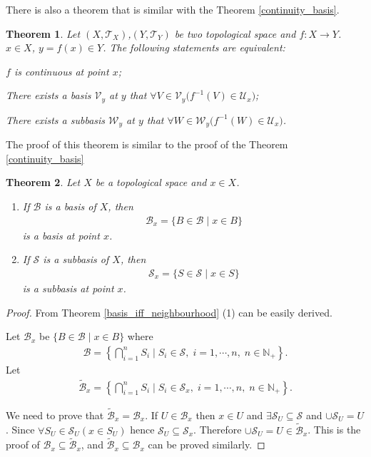 \documentclass[openany]{book}
\theoremstyle{plain}
\newtheorem{theorem}{Theorem}[section] %
\theoremstyle{definition}
\begin{document}
There is also a theorem that is similar with the Theorem \ref{continuity_basis}.

\begin{theorem}\label{continuity_basis_neighbourhood}
Let $(X,\mathscr T_X)$,$(Y,\mathscr T_Y)$ be two topological space and $f \colon X\to Y$.
$x\in X$, $y = f(x)\in Y$.
The following statements are equivalent:
\begin{conditionlist}[label=(\arabic*)]
\item $f $ is continuous at point $x$;
\item There exists a basis $\mathscr V_y$ at $y$ that $\forall V\in \mathscr V_y\big(
	f^{-1}(V) \in \mathscr U_x\big)$;
\item There exists a subbasis $\mathscr W_y$ at $y$ that $\forall W\in \mathscr W_y\big(
	f^{-1}(W) \in \mathscr U_x\big)$.
\end{conditionlist}
\end{theorem}
The proof of this theorem is similar to the proof of the Theorem \ref{continuity_basis}

\begin{theorem}\label{basis_subbasis_topology_and_neighbourhood}
Let $X$ be a topological space and $x \in X$.
\begin{enumerate}[label=(\arabic*)]
\item If $\mathscr B$ is a basis of $X$, then
\begin{align*}
	\mathscr B_x = \{B\in \mathscr B\mid x \in B\}
\end{align*}
is a basis at point $x$.
\item If $\mathscr S$ is a subbasis of $X$, then
\begin{align*}
	\mathscr S_x = \{S\in \mathscr S\mid x \in S\}
\end{align*}
is a subbasis at point $x$.
\end{enumerate}
\end{theorem}
\begin{proof}
From Theorem \ref{basis_iff_neighbourhood} (1) can be easily derived. 

Let $\mathscr B_x$ be $\{B\in \mathscr B\mid x\in B\}$ where
\begin{align*}
	\mathscr B = \left\{
		\bigcap\limits_{i=1}^n S_i \mid
			S_i \in \mathscr S,\;i=1,\cdots,n,\;n\in\mathbb N_+\right\}.
\end{align*}
Let
\begin{align*}
	\tilde{\mathscr B}_x = \left\{
		\bigcap\limits_{i=1}^n S_i \mid
			S_i \in \mathscr S_x,\;i=1,\cdots,n,\;n\in\mathbb N_+\right\}.
\end{align*}

We need to prove that $\tilde{\mathscr B}_x = \mathscr B_x$. 
If $U \in \mathscr B_x$ then
$x\in U$ and $\exists \mathscr S_U \subseteq \mathscr S$ and $\cup \mathscr S_U = U$.
Since $\forall S_U \in \mathscr S_U (x\in S_U)$ hence $\mathscr S_U \subseteq \mathscr S_x$.
Therefore $\cup \mathscr S_U = U \in \tilde{\mathscr B}_x$. 
This is the proof of $\mathscr B_x \subseteq \tilde{\mathscr B}_x$, 
and $\tilde{\mathscr B}_x \subseteq \mathscr B_x$ can be proved similarly.
\end{proof}
\end{document}

